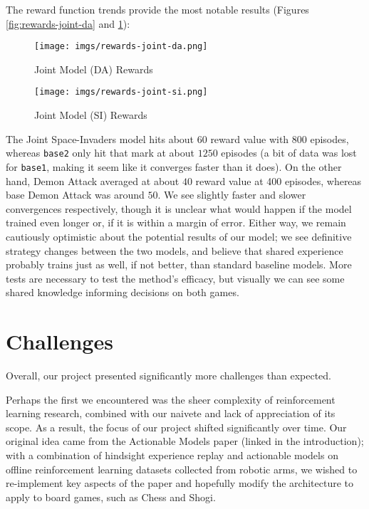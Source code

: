 \documentclass{article} %
\begin{document}
The reward function trends provide the most notable results (Figures \ref{fig:rewards-joint-da} and
\ref{fig:rewards-joint-si}):

\begin{figure}
    \centering
    \begin{minipage}{0.45\textwidth}
        \centering
        \texttt{[image: imgs/rewards-joint-da.png]} %
        \caption{Joint Model (DA) Rewards}
        \label{fig:rewards-joint-da}
    \end{minipage}\hfill
    \begin{minipage}{0.45\textwidth}
        \centering
        \texttt{[image: imgs/rewards-joint-si.png]} %
        \caption{Joint Model (SI) Rewards}
        \label{fig:rewards-joint-si}
    \end{minipage}
\end{figure}

The Joint Space-Invaders model hits about 60 reward value with 800 episodes, whereas \texttt{base2}
only hit that mark at about $1250$ episodes (a bit of data was lost for \texttt{base1}, making it
seem like it converges faster than it does). On the other hand, Demon Attack averaged at about $40$
reward value at 400 episodes, whereas base Demon Attack was around $50$. We see slightly faster and
slower convergences respectively, though it is unclear what would happen if the model trained even
longer or, if it is within a margin of error. Either way, we remain cautiously optimistic about the
potential results of our model; we see definitive strategy changes between the two models, and
believe that shared experience probably trains just as well, if not better, than standard baseline
models. More tests are necessary to test the method's efficacy, but visually we can see some shared
knowledge informing decisions on both games.


\section{Challenges}

Overall, our project presented significantly more challenges than expected.

Perhaps the first we encountered was the sheer complexity of reinforcement learning research,
combined with our naivete and lack of appreciation of its scope. As a result, the focus of our
project shifted significantly over time. Our original idea came from the Actionable Models paper
(linked in the introduction); with a combination of hindsight experience replay and actionable
models on offline reinforcement learning datasets collected from robotic arms, we wished to
re-implement key aspects of the paper and hopefully modify the architecture to apply to board games,
such as Chess and Shogi. 
\end{document}

